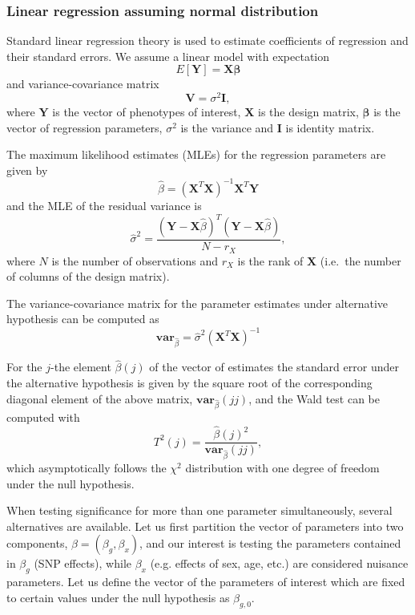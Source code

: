 \documentclass[12pt,a4paper]{article}
\begin{document}
\subsubsection{Linear regression assuming normal distribution}
Standard linear regression theory is used to estimate coefficients of
regression and their standard errors. We assume a linear model with
expectation
\begin{equation}
E[\mathbf{Y}] = \mathbf{X} \boldsymbol{\beta}
\label{expectation}
\end{equation}
and variance-covariance matrix 
$$
\mathbf{V} = \sigma^2 \mathbf{I},
$$
where $\mathbf{Y}$ is the vector of phenotypes of interest, 
$\mathbf{X}$ is the design matrix, $\boldsymbol{\beta}$ is the vector of regression 
parameters, $\sigma^2$ is the variance and $\mathbf{I}$ is identity matrix. 

The maximum likelihood estimates (MLEs) for the regression parameters 
are given by
\begin{equation}
\hat{\beta} = (\mathbf{X}^T \mathbf{X})^{-1} \mathbf{X}^T \mathbf{Y}
\end{equation}
and the MLE of the residual variance is
\begin{equation}
\hat{\sigma}^2 = \frac{(\mathbf{Y} - \mathbf{X}\hat{\beta})^T (\mathbf{Y} - \mathbf{X}\hat{\beta})}
			{N-r_X},
\end{equation}
where $N$ is the number of observations and $r_X$ is the rank of $\mathbf{X}$ 
(i.e.~the number of columns of the design matrix). 

The variance-covariance matrix for the parameter estimates under 
alternative hypothesis can be computed as 
\begin{equation}
\mathbf{var}_{\hat{\beta}} = \hat{\sigma}^2 (\mathbf{X}^T\mathbf{X})^{-1}
\end{equation}

For the $j$-the element $\hat{\beta}(j)$ of the vector of estimates the standard 
error under the alternative hypothesis is given by the square root of the 
corresponding diagonal element of the above matrix, $\mathbf{var}_{\hat{\beta}}(jj)$,
and the Wald test can be computed with
$$
T^2(j) = \frac{ \hat{\beta}(j)^2 }{ \mathbf{var}_{\hat{\beta}}(jj) },
$$
which asymptotically follows the $\chi^2$ distribution with one degree of 
freedom under the null hypothesis. 

When testing significance for more than one parameter simultaneously, 
several alternatives are available. Let us first partition the vector of 
parameters into two components, $\beta = (\beta_g,\beta_x)$, and our 
interest is testing the parameters contained in $\beta_g$ (SNP effects), 
while $\beta_x$ (e.g. effects of sex, age, etc.) are considered nuisance 
parameters. Let us define the vector of the parameters of interest 
which are fixed to certain values under the null hypothesis as $\beta_{g,0}$. 
\end{document}
